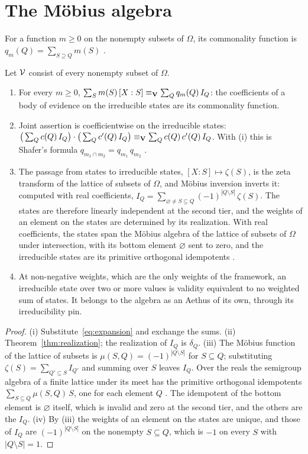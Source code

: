 \section{The M\"obius algebra}\label{sec:moebius}

For a function $m \geq 0$ on the nonempty subsets of $\Omega$, its commonality function is $q_m(Q) = \sum_{S \supseteq Q} m(S)$ \cite{shafer1976}.

\begin{theorem}\label{thm:moebius}
Let $\mathcal{V}$ consist of every nonempty subset of $\Omega$.
\begin{enumerate}
\item[(i)] For every $m \geq 0$, $\sum_S m(S)\,[X:S] \equiv_{\mathbf{V}} \sum_Q q_m(Q)\, I_Q$: the coefficients of a body of evidence on the irreducible states are its commonality function.
\item[(ii)] Joint assertion is coefficientwise on the irreducible states: $\big(\sum_Q c(Q)\, I_Q\big)\cdot\big(\sum_Q c'(Q)\, I_Q\big) \equiv_{\mathbf{V}} \sum_Q c(Q)\,c'(Q)\, I_Q$. With (i) this is Shafer's formula $q_{m_1 \cap m_2} = q_{m_1}\, q_{m_2}$ \cite{shafer1976}.
\item[(iii)] The passage from states to irreducible states, $[X:S] \mapsto \zeta(S)$, is the zeta transform of the lattice of subsets of $\Omega$, and M\"obius inversion inverts it: computed with real coefficients, $I_Q = \sum_{\varnothing \neq S \subseteq Q} (-1)^{|Q \setminus S|}\, \zeta(S)$. The states are therefore linearly independent at the second tier, and the weights of an element on the states are determined by its realization. With real coefficients, the states span the M\"obius algebra of the lattice of subsets of $\Omega$ under intersection, with its bottom element $\varnothing$ sent to zero, and the irreducible states are its primitive orthogonal idempotents \cite{solomon1967, greene1973}.
\item[(iv)] At non-negative weights, which are the only weights of the framework, an irreducible state over two or more values is validity equivalent to no weighted sum of states. It belongs to the algebra as an Aethus of its own, through its irreducibility pin.
\end{enumerate}
\end{theorem}

\begin{proof}
(i) Substitute~\eqref{eq:expansion} and exchange the sums. (ii) Theorem~\ref{thm:realization}; the realization of $I_Q$ is $\delta_Q$. (iii) The M\"obius function of the lattice of subsets is $\mu(S, Q) = (-1)^{|Q \setminus S|}$ for $S \subseteq Q$; substituting $\zeta(S) = \sum_{Q' \subseteq S} I_{Q'}$ and summing over $S$ leaves $I_Q$. Over the reals the semigroup algebra of a finite lattice under its meet has the primitive orthogonal idempotents $\sum_{S \subseteq Q} \mu(S, Q)\, S$, one for each element $Q$ \cite{solomon1967, greene1973}. The idempotent of the bottom element is $\varnothing$ itself, which is invalid and zero at the second tier, and the others are the $I_Q$. (iv) By (iii) the weights of an element on the states are unique, and those of $I_Q$ are $(-1)^{|Q \setminus S|}$ on the nonempty $S \subseteq Q$, which is $-1$ on every $S$ with $|Q \setminus S| = 1$.
\end{proof}


